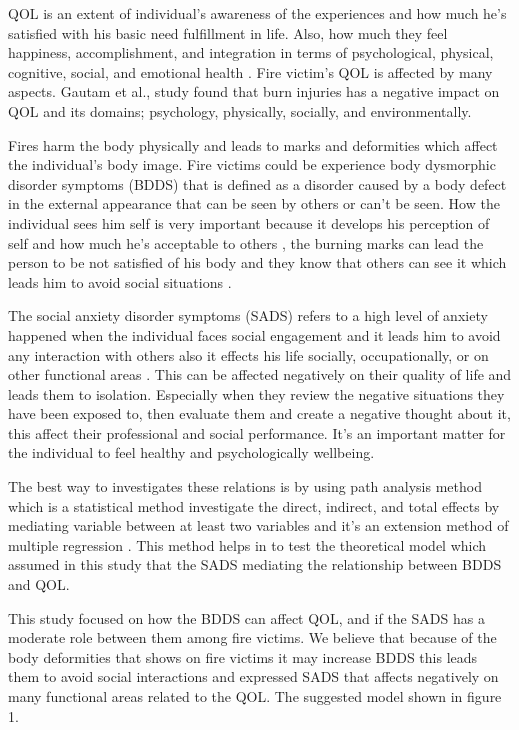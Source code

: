 \documentclass[10pt]{NSP1}
\begin{document}
QOL is an extent of individual’s awareness of the experiences and how much he’s satisfied with his basic need fulfillment in life. Also, how much they feel happiness, accomplishment, and integration in terms of psychological, physical, cognitive, social, and emotional health \cite{ref5}. Fire victim’s QOL is affected by many aspects. Gautam et al., \cite{ref6} study found that burn injuries has a negative impact on QOL and its domains; psychology, physically, socially, and environmentally.

Fires harm the body physically and leads to marks and deformities which affect the individual’s body image. Fire victims could be experience body dysmorphic disorder symptoms (BDDS) that is defined as a disorder caused by a body defect in the external appearance that can be seen by others or can’t be seen\cite{ref7}. How the individual sees him self is very important because it develops his perception of self and how much he’s acceptable to others \cite{ref8}, the burning marks can lead the person to be not satisfied of his body and they know that others can see it which leads him to avoid social situations \cite{ref9}.

The social anxiety disorder symptoms (SADS) refers to a high level of anxiety happened when the individual faces social engagement and it leads him to avoid any interaction with others also it effects his life socially, occupationally, or on other functional areas \cite{ref10}. This can be affected negatively on their quality of life and leads them to isolation. Especially when they review the negative situations they have been exposed to, then evaluate them and create a negative thought about it, this affect their professional and social performance. It’s an important matter for the individual to feel healthy and psychologically wellbeing.

The best way to investigates these relations is by using path analysis method which is a statistical method investigate the direct, indirect, and total effects by mediating variable between at least two variables and it’s an extension method of multiple regression \cite{ref11}. This method helps in to test the theoretical model which assumed in this study that the SADS mediating the relationship between BDDS and QOL.

This study focused on how the BDDS can affect QOL, and if the SADS has a moderate role between them among fire victims. We believe that because of the body deformities that shows on fire victims it may increase BDDS this leads them to avoid social interactions and expressed SADS that affects negatively on many functional areas related to the QOL. The suggested model shown in figure 1.
\end{document}
